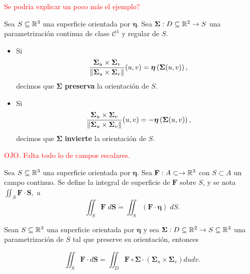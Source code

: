  \textcolor{red}{Se podria explicar un poco más el ejemplo? }


\begin{definition}
    Sea $S\subseteq\mathbb{R}^3$ una superficie orientada por $\boldsymbol{\eta}$. Sea $\boldsymbol{\Sigma}:D\subseteq\mathbb{R}^2\to S$ una parametrizaci\'on continua de clase $\mathcal{C}^1$ y regular de $S$.
    \begin{itemize}
        \item Si \[
            \frac{\boldsymbol{\Sigma}_u\times\boldsymbol{\Sigma}_v}{\norm{\boldsymbol{\Sigma}_u\times\boldsymbol{\Sigma}_v}}(u,v)=\boldsymbol{\eta}\left(\boldsymbol{\Sigma}(u,v)\right),
        \]  
        decimos que $\boldsymbol{\Sigma}$ \textbf{preserva} la orientaci\'on de $S$.
        \item Si \[
            \frac{\boldsymbol{\Sigma}_u\times\boldsymbol{\Sigma}_v}{\norm{\boldsymbol{\Sigma}_u\times\boldsymbol{\Sigma}_v}}(u,v)=-\boldsymbol{\eta}\left(\boldsymbol{\Sigma}(u,v)\right),
        \]
        decimos que $\boldsymbol{\Sigma}$ \textbf{invierte} la orientaci\'on de $S$.  
    \end{itemize}
\end{definition}


 \textcolor{red}{OJO. Falta todo lo de campos escalares. }



\begin{definition}
    Sea $S\subseteq\mathbb{R}^3$ una superficie orientada por $\boldsymbol{\eta}$. Sea $\mathbf{F}:A \subset \to\mathbb{R}^3$ con $S\subset A$ un campo continuo. Se define la integral de superficie de $\mathbf{F}$ sobre $S$, y se nota  $\iint_S\mathbf{F}\cdot \mathbf{S},$ a
    \[
        \iint_S \mathbf{F}\;d\mathbf{S}=\iint_S (\mathbf{F}\cdot\boldsymbol{\eta}) \;dS.
    \]
\end{definition}

\begin{obs}   Sean $S\subseteq\mathbb{R}^3$ una superficie orientada por $\boldsymbol{\eta}$ y  sea  $\boldsymbol{\Sigma}:D\subseteq\mathbb{R}^2\to S\subseteq\mathbb{R}^3$ una parametrizaci\'on de $S$ tal que preserve su orientaci\'on, entonces 

 $$ \iint_S \mathbf{F}\cdot d\mathbf{S} = \iint_D \mathbf{F}\circ\boldsymbol{\Sigma}\cdot\left(\boldsymbol{\Sigma}_u\times\boldsymbol{\Sigma}_v\right)dudv.$$
\end{obs}


